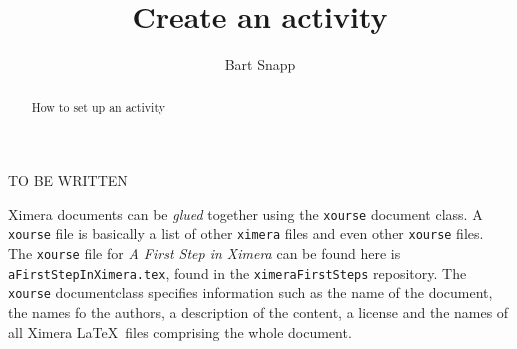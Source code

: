 \documentclass{ximera}
\title{Create an activity}
\author{Bart Snapp}
\begin{document}
\begin{abstract}
  How to set up an activity
\end{abstract}
\maketitle


{\color{red} TO BE WRITTEN 
}

Ximera documents can be \textit{glued} together using the \texttt{xourse}
document
class.
A \verb|xourse| file is basically a list of other \verb|ximera| files and even
other \verb|xourse| files.
The \verb|xourse| file for \textit{A First Step in Ximera} can be found here is
\verb!aFirstStepInXimera.tex!, found in the \verb!ximeraFirstSteps! repository.
The \verb!xourse! documentclass specifies information such as the name of the
document, the names fo the authors, a description of the content, a license and
the names of all Ximera \LaTeX\ files comprising
the whole document.
\end{document}
